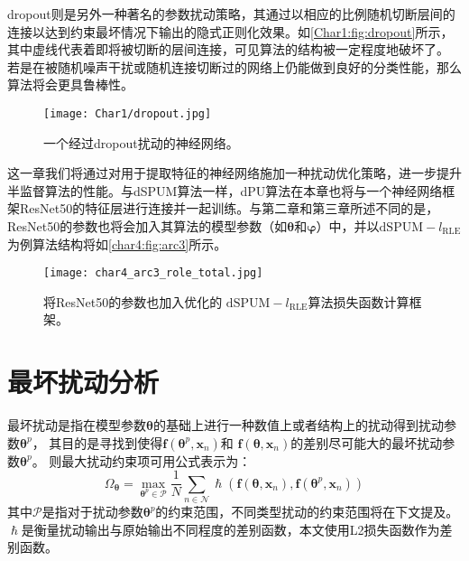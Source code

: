 dropout则是另外一种著名的参数扰动策略，其通过以相应的比例随机切断层间的连接以达到约束最坏情况下输出的隐式正则化效果\cite{Wei_Dropout_2020}。如\autoref{Char1:fig:dropout}所示，其中虚线代表着即将被切断的层间连接，可见算法的结构被一定程度地破坏了。
若是在被随机噪声干扰或随机连接切断过的网络上仍能做到良好的分类性能，那么算法将会更具鲁棒性\cite{Krizhevsky_ImageNet_2012}。
\begin{figure}[htbp]
    \centering
    \texttt{[image: Char1/dropout.jpg]}
    \caption{\label{Char1:fig:dropout}{一个经过dropout扰动的神经网络。}}
\end{figure}

这一章我们将通过对用于提取特征的神经网络{施加}一种扰动优化策略，进一步提升半监督算法的性能。与dSPUM算法一样，dPU算法在本章也将与一个神经网络框架ResNet50的特征层进行连接并一起训练。与第二章和第三章所述不同的是，ResNet50的参数也将会加入其算法的模型参数（如$\boldsymbol\theta$和$\boldsymbol \varphi$）中，并以$\mathrm{dSPUM}-{l_{\mathrm{RLE}}}$为例算法结构将如\autoref{char4:fig:arc3}所示。
\begin{figure}
    \centering
    \texttt{[image: char4\_arc3\_role\_total.jpg]}
    \caption{\label{char4:fig:arc3}{将ResNet50的参数也加入优化的
    $\mathrm{dSPUM}-{l_{\mathrm{RLE}}}$算法损失函数计算框架。}}
\end{figure}

\section{最坏扰动分析}\label{Char4_LossDesign}
最坏扰动是指在模型参数$\boldsymbol\theta$的基础上进行一种数值上或者结构上的扰动得到扰动参数$\boldsymbol\theta^p$，
{其目的是寻找到使得$\boldsymbol f\left(\boldsymbol\theta^p,\boldsymbol x_n\right)$和
$\boldsymbol f\left(\boldsymbol\theta,\boldsymbol x_n\right)$的差别尽可能大的最坏扰动参数$\boldsymbol\theta^p$。}
则最大扰动约束项可用公式表示为：
\begin{equation}
    \label{Pertur_Re}
    \Omega_{\boldsymbol\theta}=\max _{\boldsymbol\theta^p \in \mathcal{P}}  \frac{1}{N} \sum_{n \in \mathcal{N}}
    \hslash\left(\boldsymbol f\left(\boldsymbol\theta,\boldsymbol x_n\right),
    \boldsymbol f\left(\boldsymbol\theta^p,\boldsymbol x_n\right)\right)
\end{equation}
其中$\mathcal{P}$是指对于扰动参数$\boldsymbol\theta^p$的约束范围，不同类型扰动的约束范围将在下文提及。
$\hslash$是衡量扰动输出与原始输出不同程度的差别函数，{本文使用L2损失函数作为差别函数}。

